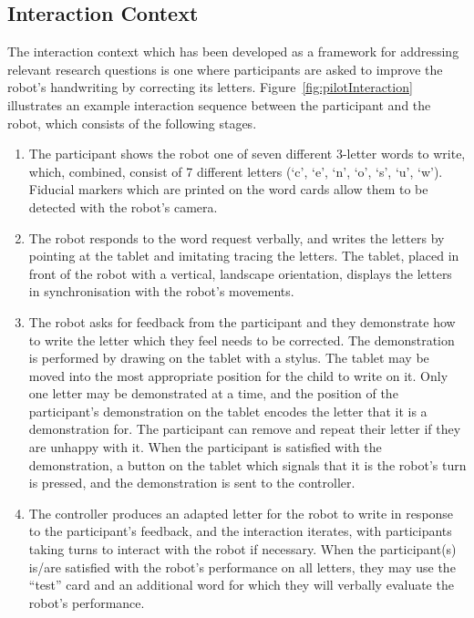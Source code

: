 \documentclass{sig-alternate}
\begin{document}
\subsection{Interaction Context}

The interaction context which has been developed as a framework for addressing
relevant research questions is one where participants are asked to improve the robot's
handwriting by correcting its letters. Figure~\ref{fig:pilotInteraction}
illustrates an example interaction sequence between the participant and the
robot, which consists of the following stages.

\begin{enumerate}

    \item The participant shows the robot one of seven different 3-letter words
        to write, which, combined, consist of 7 different letters (`c', `e',
        `n', `o', `s', `u', `w'). Fiducial markers which are printed on the word
        cards allow them to be detected with the robot's camera. 

    \item The robot responds to the word request verbally, and writes the
        letters by pointing at the tablet and imitating tracing the letters. The
        tablet, placed in front of the robot with a vertical, landscape orientation,
        displays the letters in synchronisation with the robot's movements. 

    \item The robot asks for feedback from the participant and they demonstrate
        how to write the letter which they feel needs to be corrected. The
        demonstration is performed by drawing on the tablet with a stylus. The
        tablet may be moved into the most appropriate position for the child to
        write on it. Only one letter may be demonstrated at a time, and the
        position of the participant's demonstration on the tablet encodes the
        letter that it is a demonstration for. The participant can remove and
        repeat their letter if they are unhappy with it.
        When the participant is satisfied with the demonstration, a button on
        the tablet which signals that it is the robot's turn is pressed, and the
        demonstration is sent to the controller.

    \item The controller produces an adapted letter for the robot to write in
        response to the participant's feedback, and the interaction iterates,
        with participants taking turns to interact with the robot if necessary.
        When the participant(s) is/are satisfied with the robot's performance on 
	all letters,
        they may use the ``test'' card and an additional word for which they will
        verbally evaluate the robot's performance. 

\end{enumerate}
\end{document}
